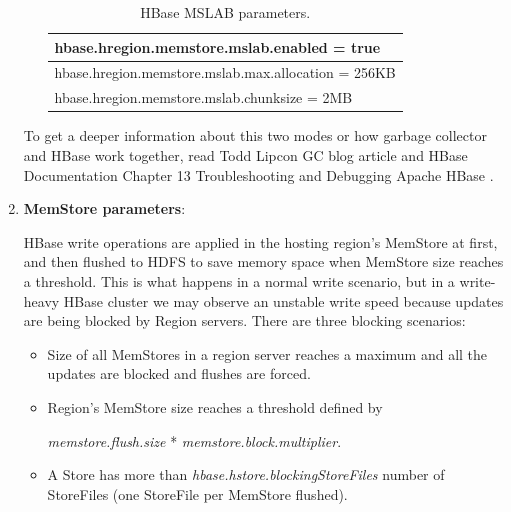 \begin{enumerate}
\begin{enumerate}
\par
\begin{table}[htbp]
\begin{center}
\begin{tabular}{|l|}
\hline
hbase.hregion.memstore.mslab.enabled = true \\ \hline
hbase.hregion.memstore.mslab.max.allocation = 256KB \\ \hline
hbase.hregion.memstore.mslab.chunksize = 2MB\\ \hline
\end{tabular}
\label{HBase MSLAB parameters.}
\caption{HBase MSLAB parameters.}
\end{center}
\end{table}

\end{enumerate}


To get a deeper information about this two modes or how garbage collector and HBase work together, read Todd Lipcon GC blog article \cite{MSLABexplained} and HBase Documentation Chapter 13 Troubleshooting and Debugging Apache HBase \cite{ApacheHBaseLogs}.

\item \textbf{MemStore parameters}:
\par
HBase write operations are applied in the hosting region's MemStore at first, and then flushed to HDFS to save memory space when MemStore size reaches a threshold. This is what happens in a normal write scenario, but in a write-heavy HBase cluster we may observe an unstable write speed because updates are being blocked by Region servers. There are three blocking scenarios:
\begin{itemize}
\item Size of all MemStores in a region server reaches a maximum and all the updates are blocked and flushes are forced.
\item Region's MemStore size reaches a threshold defined by
\par
\textit{memstore.flush.size} * \textit{memstore.block.multiplier}.
\item A Store has more than \textit{hbase.hstore.blockingStoreFiles} number of StoreFiles (one StoreFile per MemStore flushed).
\end{itemize}


\end{enumerate}
